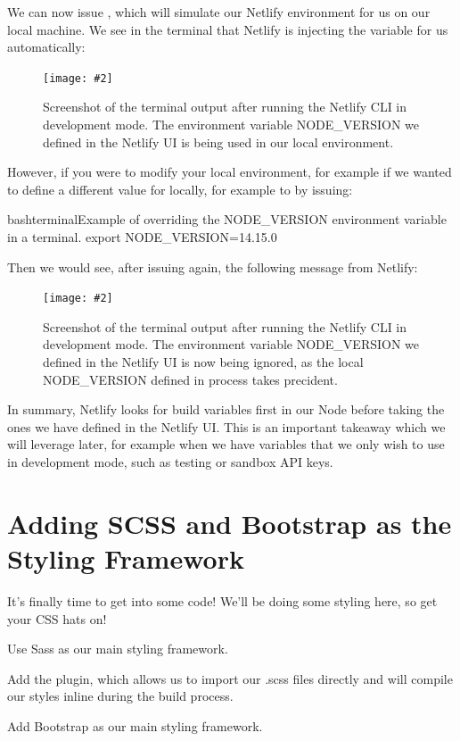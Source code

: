 \documentclass[a4paper,headinclude=on,footinclude=on,12pt,oneside]{scrbook}
\newcommand{\standardfigure}[3]{\begin{figure}[H]\begin{center}\texttt{[image: \#2]}\caption{#3}\label{fig:#2}\end{center}\end{figure}}
\begin{document}

We can now issue , which will simulate our Netlify environment for us on our local machine. We see in the terminal that Netlify is injecting the  variable for us automatically:

\standardfigure{\textwidth}{frontend/netlify/netlify-injected-build-var}{Screenshot of the terminal output after running the Netlify CLI in development mode. The environment variable NODE\_VERSION we defined in the Netlify UI is being used in our local environment.}

However, if you were to modify your local environment, for example if we wanted to define a different value for  locally, for example to  by issuing:

\begin{codeInput}{bash}{terminal}{Example of overriding the NODE\_VERSION environment variable in a terminal.}
export NODE_VERSION=14.15.0
\end{codeInput}

Then we would see, after issuing  again, the following message from Netlify:

\standardfigure{\textwidth}{frontend/netlify/netlify-ignored-build-var}{Screenshot of the terminal output after running the Netlify CLI in development mode. The environment variable NODE\_VERSION we defined in the Netlify UI is now being ignored, as the local NODE\_VERSION defined in process takes precident.}

In summary, Netlify looks for build variables first in our Node  before taking the ones we have defined in the Netlify UI. This is an important takeaway which we will leverage later, for example when we have variables that we only wish to use in development mode, such as testing or sandbox API keys.

\section{Adding SCSS and Bootstrap as the Styling Framework}

It's finally time to get into some code! \partypopper We'll be doing some styling here, so get your CSS hats on!

\begin{arrows}
\item Use Sass as our main styling framework.
\item Add the  plugin, which allows us to import our .scss files directly and will compile our styles inline during the build process.
\item Add Bootstrap as our main styling framework.
\end{arrows}
\end{document}
